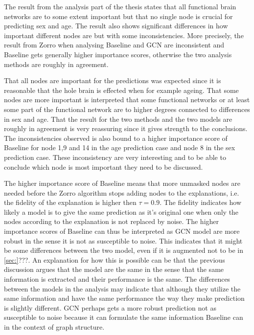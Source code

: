 The result from the analysis part of the thesis states that all functional brain networks are to some extent important but that no single node is crucial for predicting sex and age. The result also shows significant differences in how important different nodes are but with some inconsistencies. More precisely, the result from Zorro when analysing Baseline and GCN are inconsistent and Baseline gets generally higher importance scores, otherwise the two analysis methods are roughly in agreement. 


That all nodes are important for the predictions was expected since it is reasonable that the hole brain is effected when for example ageing. That some nodes are more important is interpreted that some functional networks or at least some part of the functional network are to higher degrees connected to differences in sex and age. That the result for the two methods and the two models are roughly in agreement is very reassuring since it gives strength to the conclusions. The inconsistencies observed is also bound to a higher importance score of Baseline for node 1,9 and 14 in the age prediction case and node 8 in the sex prediction case. These inconsistency are very interesting and to be able to conclude which node is most important they need to be discussed. 

The higher importance score of Baseline means that more unmasked nodes are needed before the Zorro algorithm stops adding nodes to the explanations, i.e. the fidelity of the explanation is higher then $\tau = 0.9$. The fidelity indicates how likely a model is to give the same prediction as it's original one when only the nodes according to the explanation is not replaced by noise. The higher importance scores of Baseline can thus be interpreted as GCN model are more robust in the sense it is not as susceptible to noise.
This indicates that it might be some differences between the two model, even if it is augmented not to be in \ref{sec:}???. An explanation for how this  is possible can be that the previous discussion argues that the model are the same in the sense that the same information is extracted and their performance is the same. The differences between the models in the analysis may indicate that although they utilize the same information and have the same performance the way they make prediction is slightly different. GCN perhaps gets a more robust prediction not as susceptible to noise because it can formulate the same information Baseline can in the context of graph structure. 


